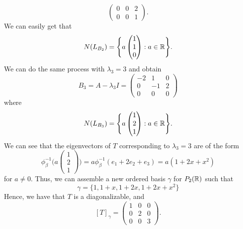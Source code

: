 \begin{eg}
\[\begin{pmatrix}
        0 & 0 & 2 \\
        0 & 0 & 1 
              \end{pmatrix}. \]
        We can easily get that
        \[  N({L}_{{B}_{2}}) = \Bigg\{ a \begin{pmatrix} 
                1 \\
                1 \\
                0 
                  \end{pmatrix} : a \in \mathbb{R} \Bigg\}. \]
        We can do the same process with \( {\lambda}_{3} = 3  \) and obtain 
        \[  {B}_{3} = A - {\lambda}_{3}I = \begin{pmatrix} 
            -2 & 1 & 0 \\
            0 & -1 & 2 \\
            0 & 0 & 0 
                  \end{pmatrix} \]
            where 
            \[  N({L}_{{B}_{3}}) = \Bigg\{ a \begin{pmatrix} 
                       1 \\
                       2 \\
                       1 
                      \end{pmatrix} : a \in \mathbb{R} \Bigg\}. \]
            We can see that the eigenvectors of \( T  \) corresponding to \( {\lambda}_{3} = 3  \) are of the form 
            \[  {\phi}_{\beta}^{-1} \Bigg( a \begin{pmatrix} 
                       1 \\
                       2 \\
                       1
                      \end{pmatrix}    \Bigg) = a {\phi}_{\beta}^{-1} ({e}_{1} + {2e}_{2} + {e}_{3}) = a (1 + 2x + x^{2}) \] for \( a \neq 0  \). Thus, we can assemble a new ordered basis \( \gamma  \) for \( {P}_{2}(\mathbb{R}) \) such that 
                      \[  \gamma = \{  1, 1 + x, 1 + 2x, 1 + 2x + x^{2} \} \]
Hence, we have that \( T  \) is a diagonalizable, and  
\[  [T]_{\gamma} = \begin{pmatrix} 
    1 & 0 & 0 \\
    0 & 2 & 0 \\
    0 & 0 & 3 
          \end{pmatrix}. \]

\end{eg}
